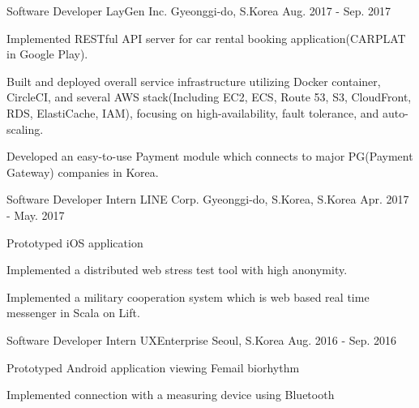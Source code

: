 \begin{cventries}
  \cventry
    {Software Developer} %
    {LayGen Inc.} %
    {Gyeonggi-do, S.Korea} %
    {Aug. 2017 - Sep. 2017} %
    {
      \begin{cvitems} %
        \item {Implemented RESTful API server for car rental booking application(CARPLAT in Google Play).}
        \item {Built and deployed overall service infrastructure utilizing Docker container, CircleCI, and several AWS stack(Including EC2, ECS, Route 53, S3, CloudFront, RDS, ElastiCache, IAM), focusing on high-availability, fault tolerance, and auto-scaling.}
        \item {Developed an easy-to-use Payment module which connects to major PG(Payment Gateway) companies in Korea.}
      \end{cvitems}
    }

  \cventry
    {Software Developer Intern} %
    {LINE Corp.} %
    {Gyeonggi-do, S.Korea, S.Korea} %
    {Apr. 2017 - May. 2017} %
    {
      \begin{cvitems} %
        \item {Prototyped iOS application}
        \item {Implemented a distributed web stress test tool with high anonymity.}
        \item {Implemented a military cooperation system which is web based real time messenger in Scala on Lift.}
      \end{cvitems}
    }

  \cventry
    {Software Developer Intern} %
    {UXEnterprise} %
    {Seoul, S.Korea} %
    {Aug. 2016 - Sep. 2016} %
    {
      \begin{cvitems} %
        \item {Prototyped Android application viewing Femail biorhythm}
        \item {Implemented connection with a measuring device using Bluetooth}
      \end{cvitems}
    }

\end{cventries}
